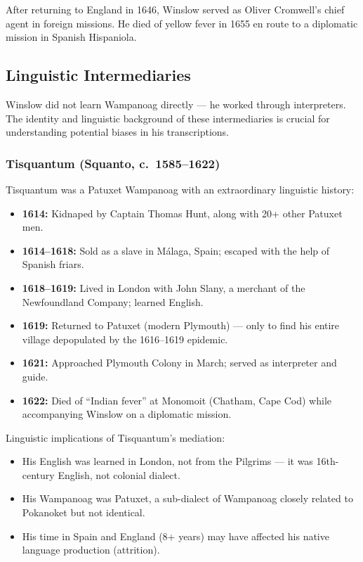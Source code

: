 After returning to England in 1646, Winslow served as Oliver Cromwell's chief
agent in foreign missions. He died of yellow fever in 1655 en route to a
diplomatic mission in Spanish Hispaniola.

\subsection{Linguistic Intermediaries}

Winslow did not learn Wampanoag directly --- he worked through interpreters.
The identity and linguistic background of these intermediaries is crucial for
understanding potential biases in his transcriptions.

\subsubsection{Tisquantum (Squanto, c.~1585--1622)}

Tisquantum was a Patuxet Wampanoag with an extraordinary linguistic history:

\begin{itemize}
  \item \textbf{1614:} Kidnaped by Captain Thomas Hunt, along with 20+ other
    Patuxet men.
  \item \textbf{1614--1618:} Sold as a slave in Málaga, Spain; escaped with the
    help of Spanish friars.
  \item \textbf{1618--1619:} Lived in London with John Slany, a merchant of the
    Newfoundland Company; learned English.
  \item \textbf{1619:} Returned to Patuxet (modern Plymouth) --- only to find
    his entire village depopulated by the 1616--1619 epidemic.
  \item \textbf{1621:} Approached Plymouth Colony in March; served as
    interpreter and guide.
  \item \textbf{1622:} Died of ``Indian fever'' at Monomoit (Chatham, Cape Cod)
    while accompanying Winslow on a diplomatic mission.
\end{itemize}

Linguistic implications of Tisquantum's mediation:
\begin{itemize}
  \item His English was learned in London, not from the Pilgrims --- it was
    16th-century English, not colonial dialect.
  \item His Wampanoag was Patuxet, a sub-dialect of Wampanoag closely related
    to Pokanoket but not identical.
  \item His time in Spain and England (8+ years) may have affected his native
    language production (attrition).
\end{itemize}

